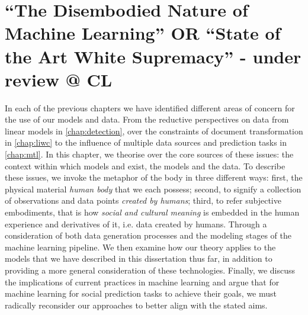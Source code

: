 \ifpdf
    \graphicspath{{Chapter8/Figs/Raster/}{Chapter8/Figs/PDF/}{Chapter8/Figs/}}
\else
    \graphicspath{{Chapter8/Figs/Vector/}{Chapter8/Figs/}}
\fi


\chapter{``The Disembodied Nature of Machine Learning'' OR ``State of the Art White Supremacy'' - under review @ CL}\label{chap:disembodied}


In each of the previous chapters we have identified different areas of concern for the use of our models and data. From the reductive perspectives on data from linear models in \autoref{chap:detection}, over the constraints of document transformation in \autoref{chap:liwc} to the influence of multiple data sources and prediction tasks in \autoref{chap:mtl}. In this chapter, we theorise over the core sources of these issues: the context within which models and exist, the models and the data.
To describe these issues, we invoke the metaphor of the body in three different ways: first, the physical material \textit{human body} that we each possess; second, to signify a collection of observations and data points \textit{created by humans}; third, to refer subjective embodiments, that is how \textit{social and cultural meaning} is embedded in the human experience and derivatives of it, i.e. data created by humans.
 Through a consideration of both data generation processes and the modeling stages of the machine learning pipeline. We then examine how our theory applies to the models that we have described in this dissertation thus far, in addition to providing a more general consideration of these technologies. Finally, we discuss the implications of current practices in machine learning and argue that for machine learning for social prediction tasks to achieve their goals, we must radically reconsider our approaches to better align with the stated aims.


